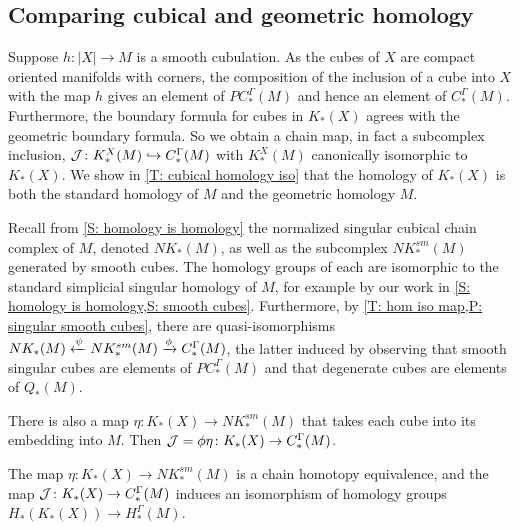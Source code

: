 \subsection{Comparing cubical and geometric homology}\label{S: cubical and geometric homology}

Suppose $h \colon |X| \to M$ is a smooth cubulation.
As the cubes of $X$ are compact oriented manifolds with corners, the composition of the inclusion of a cube into $X$ with the map $h$ gives an element of $PC_*^\Gamma(M)$ and hence an element of $C_*^\Gamma(M)$.
Furthermore, the boundary formula for cubes in $K_*(X)$ agrees with the geometric boundary formula.
So we obtain a chain map, in fact a subcomplex inclusion, $\mathcal{J} \colon K^X_*(M) \hookrightarrow C^\Gamma_*(M)$ with $K_*^X(M)$ canonically isomorphic to $K_*(X)$.
We show in \cref{T: cubical homology iso} that the homology of $K_*(X)$ is both the standard homology of $M$ and the geometric homology $M$.

Recall from \cref{S: homology is homology} the normalized singular cubical chain complex of $M$, denoted $NK_*(M)$, as well as the subcomplex $NK^{sm}_*(M)$ generated by smooth cubes.
The homology groups of each are isomorphic to the standard simplicial singular homology of $M$, for example by our work in \cref{S: homology is homology,S: smooth cubes}.
Furthermore, by \cref{T: hom iso map,P: singular smooth cubes}, there are quasi-isomorphisms $NK_*(M) \xleftarrow{\psi} NK^{sm}_*(M) \xrightarrow{\phi} C^\Gamma_*(M)$, the latter induced by observing that smooth singular cubes are elements of $PC^\Gamma_*(M)$ and that degenerate cubes are elements of $Q_*(M)$.

There is also a map $\eta: K_*(X) \to NK^{sm}_*(M)$ that takes each cube into its embedding into $M$.
Then $\mathcal{J} = \phi\eta \colon K_*(X) \to C^\Gamma_*(M)$.


\begin{theorem}\label{T: cubical homology iso}
	The map $\eta: K_*(X) \to NK^{sm}_*(M)$ is a chain homotopy equivalence, and the map $\mathcal{J} \colon K_*(X) \to C^\Gamma_*(M)$ induces an isomorphism of homology groups $H_*(K_*(X)) \to H_*^\Gamma(M)$.
\end{theorem}

